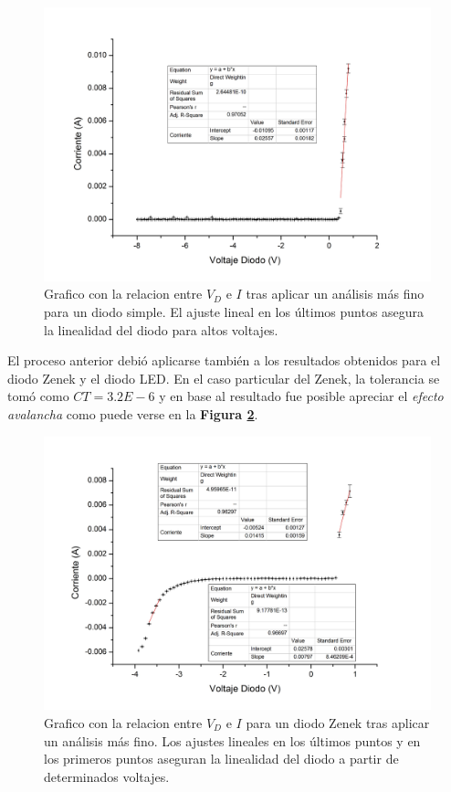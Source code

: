 \documentclass[11pt,a4paper]{article}
\begin{document}
\begin{figure}[H]
\centering
\includegraphics[scale=0.36]{simple_mejor}
   \caption{Grafico con la relacion entre $V_D$ e $I$ tras aplicar un análisis más fino para un diodo simple. El ajuste lineal en los últimos puntos asegura la linealidad del diodo para altos voltajes.}
   \label{fig:simple_mejor}
\end{figure}

El proceso anterior debió aplicarse también a los resultados obtenidos para el diodo Zenek y el diodo LED. En el caso particular del Zenek, la tolerancia se tomó como $CT = 3.2E-6$ y en base al resultado fue posible apreciar el \textit{efecto avalancha} como puede verse en la \textbf{Figura \ref{fig:zenek}}. 

\begin{figure}[H]
\centering
\includegraphics[scale=0.36]{zenek}
   \caption{Grafico con la relacion entre $V_D$ e $I$ para un diodo Zenek tras aplicar un análisis más fino. Los ajustes lineales en los últimos puntos y en los primeros puntos aseguran la linealidad del diodo a partir de determinados voltajes.}
   \label{fig:zenek}
\end{figure}
\end{document}
